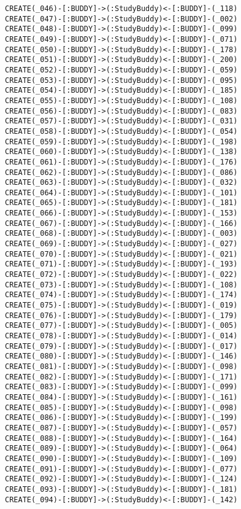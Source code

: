 \begin{lstlisting}
CREATE(_046)-[:BUDDY]->(:StudyBuddy)<-[:BUDDY]-(_118)
CREATE(_047)-[:BUDDY]->(:StudyBuddy)<-[:BUDDY]-(_002)
CREATE(_048)-[:BUDDY]->(:StudyBuddy)<-[:BUDDY]-(_099)
CREATE(_049)-[:BUDDY]->(:StudyBuddy)<-[:BUDDY]-(_071)
CREATE(_050)-[:BUDDY]->(:StudyBuddy)<-[:BUDDY]-(_178)
CREATE(_051)-[:BUDDY]->(:StudyBuddy)<-[:BUDDY]-(_200)
CREATE(_052)-[:BUDDY]->(:StudyBuddy)<-[:BUDDY]-(_059)
CREATE(_053)-[:BUDDY]->(:StudyBuddy)<-[:BUDDY]-(_095)
CREATE(_054)-[:BUDDY]->(:StudyBuddy)<-[:BUDDY]-(_185)
CREATE(_055)-[:BUDDY]->(:StudyBuddy)<-[:BUDDY]-(_108)
CREATE(_056)-[:BUDDY]->(:StudyBuddy)<-[:BUDDY]-(_083)
CREATE(_057)-[:BUDDY]->(:StudyBuddy)<-[:BUDDY]-(_031)
CREATE(_058)-[:BUDDY]->(:StudyBuddy)<-[:BUDDY]-(_054)
CREATE(_059)-[:BUDDY]->(:StudyBuddy)<-[:BUDDY]-(_198)
CREATE(_060)-[:BUDDY]->(:StudyBuddy)<-[:BUDDY]-(_138)
CREATE(_061)-[:BUDDY]->(:StudyBuddy)<-[:BUDDY]-(_176)
CREATE(_062)-[:BUDDY]->(:StudyBuddy)<-[:BUDDY]-(_086)
CREATE(_063)-[:BUDDY]->(:StudyBuddy)<-[:BUDDY]-(_032)
CREATE(_064)-[:BUDDY]->(:StudyBuddy)<-[:BUDDY]-(_101)
CREATE(_065)-[:BUDDY]->(:StudyBuddy)<-[:BUDDY]-(_181)
CREATE(_066)-[:BUDDY]->(:StudyBuddy)<-[:BUDDY]-(_153)
CREATE(_067)-[:BUDDY]->(:StudyBuddy)<-[:BUDDY]-(_166)
CREATE(_068)-[:BUDDY]->(:StudyBuddy)<-[:BUDDY]-(_003)
CREATE(_069)-[:BUDDY]->(:StudyBuddy)<-[:BUDDY]-(_027)
CREATE(_070)-[:BUDDY]->(:StudyBuddy)<-[:BUDDY]-(_021)
CREATE(_071)-[:BUDDY]->(:StudyBuddy)<-[:BUDDY]-(_193)
CREATE(_072)-[:BUDDY]->(:StudyBuddy)<-[:BUDDY]-(_022)
CREATE(_073)-[:BUDDY]->(:StudyBuddy)<-[:BUDDY]-(_108)
CREATE(_074)-[:BUDDY]->(:StudyBuddy)<-[:BUDDY]-(_174)
CREATE(_075)-[:BUDDY]->(:StudyBuddy)<-[:BUDDY]-(_019)
CREATE(_076)-[:BUDDY]->(:StudyBuddy)<-[:BUDDY]-(_179)
CREATE(_077)-[:BUDDY]->(:StudyBuddy)<-[:BUDDY]-(_005)
CREATE(_078)-[:BUDDY]->(:StudyBuddy)<-[:BUDDY]-(_014)
CREATE(_079)-[:BUDDY]->(:StudyBuddy)<-[:BUDDY]-(_017)
CREATE(_080)-[:BUDDY]->(:StudyBuddy)<-[:BUDDY]-(_146)
CREATE(_081)-[:BUDDY]->(:StudyBuddy)<-[:BUDDY]-(_098)
CREATE(_082)-[:BUDDY]->(:StudyBuddy)<-[:BUDDY]-(_171)
CREATE(_083)-[:BUDDY]->(:StudyBuddy)<-[:BUDDY]-(_099)
CREATE(_084)-[:BUDDY]->(:StudyBuddy)<-[:BUDDY]-(_161)
CREATE(_085)-[:BUDDY]->(:StudyBuddy)<-[:BUDDY]-(_098)
CREATE(_086)-[:BUDDY]->(:StudyBuddy)<-[:BUDDY]-(_199)
CREATE(_087)-[:BUDDY]->(:StudyBuddy)<-[:BUDDY]-(_057)
CREATE(_088)-[:BUDDY]->(:StudyBuddy)<-[:BUDDY]-(_164)
CREATE(_089)-[:BUDDY]->(:StudyBuddy)<-[:BUDDY]-(_064)
CREATE(_090)-[:BUDDY]->(:StudyBuddy)<-[:BUDDY]-(_109)
CREATE(_091)-[:BUDDY]->(:StudyBuddy)<-[:BUDDY]-(_077)
CREATE(_092)-[:BUDDY]->(:StudyBuddy)<-[:BUDDY]-(_124)
CREATE(_093)-[:BUDDY]->(:StudyBuddy)<-[:BUDDY]-(_181)
CREATE(_094)-[:BUDDY]->(:StudyBuddy)<-[:BUDDY]-(_142)

\end{lstlisting}
